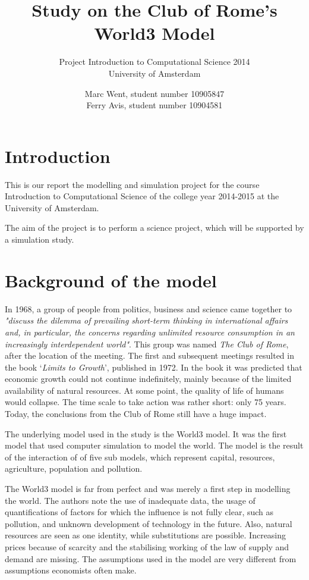 \documentclass[10pt,a4paper]{scrartcl}
\title{Study on the Club of Rome's World3 Model}
\subtitle{Project Introduction to Computational Science 2014\\
University of Amsterdam}
\author{Marc Went, student number 10905847\\Ferry Avis, student number 10904581}
\begin{document}
\maketitle

\section*{Introduction}

This is our report the modelling and simulation project for the course Introduction to Computational Science of the college year 2014-2015 at the University of Amsterdam.

The aim of the project is to perform a science project, which will be supported by a simulation study.

\section*{Background of the model}

In 1968, a group of people from politics, business and science came together to \emph{"discuss the dilemma of prevailing short-term thinking in international affairs and, in particular, the concerns regarding unlimited resource consumption in an increasingly interdependent world"}. This group was named \emph{The Club of Rome}, after the location of the meeting. The first and subsequent meetings resulted in the book `\emph{Limits to Growth}', published in 1972. In the book it was predicted that economic growth could not continue indefinitely, mainly because of the limited availability of natural resources. At some point, the quality of life of humans would collapse. The time scale to take action was rather short: only 75 years. Today, the conclusions from the Club of Rome still have a huge impact.

The underlying model used in the study is the World3 model. It was the first model that used computer simulation to model the world. The model is the result of the interaction of of five sub models, which represent capital, resources, agriculture, population and pollution.

The World3 model is far from perfect and was merely a first step in modelling the world. The authors note the use of inadequate data, the usage of quantifications of factors for which the influence is not fully clear, such as pollution, and unknown development of technology in the future. Also, natural resources are seen as one identity, while substitutions are possible. Increasing prices because of scarcity and the stabilising working of the law of supply and demand are missing. The assumptions used in the model are very different from assumptions economists often make.
\end{document}
